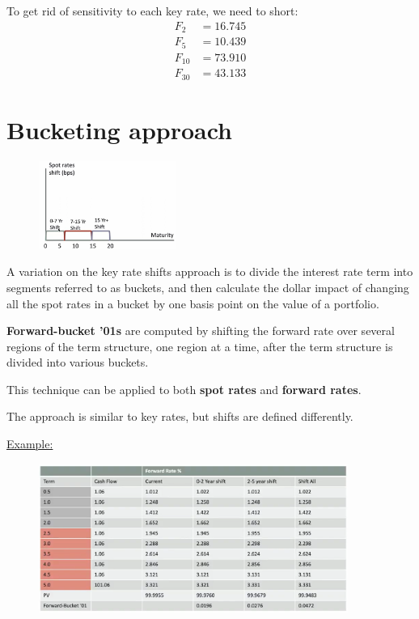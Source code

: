 \documentclass{article}
\begin{document}
\begin{center}
To get rid of sensitivity to each key rate, we need to short:
\begin{align*}
    F_2 &= 16.745
    \\
    F_5 &= 10.439
    \\
    F_{10} &= 73.910
    \\
    F_{30} &= 43.133    
\end{align*}
\end{center}

\section{Bucketing approach}

\begin{figure}
    \centering    \includegraphics[width=0.4\textwidth]{buckets.png}
\end{figure}

A variation on the key rate shifts approach is to divide the interest rate term into segments referred to as buckets, and then calculate the dollar impact of changing all the spot rates in a bucket by one basis point on the value of a portfolio.

\textbf{Forward-bucket '01s} are computed by shifting the forward rate over several regions of the term structure, one region at a time, after the term structure is divided into various buckets.

This technique can be applied to both \textbf{spot rates} and \textbf{forward rates}.

The approach is similar to key rates, but shifts are defined differently.

\underline{Example:}

\begin{figure}[h]
    \centering    \includegraphics[width=0.9\textwidth]{partial.png}
\end{figure}
\end{document}
